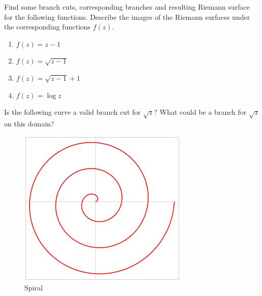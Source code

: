 \begin{exercise}
	Find some branch cuts, corresponding branches and resulting Riemann surface for the following functions. Describe the images of the Riemann surfaces under the corresponding functions $f(z)$.
	\begin{enumerate}
		\item $f(z) = {z-1}$
		\item $f(z) = \sqrt{z-1}$
		\item $f(z) = \sqrt{z-1}+1$
		\item $f(z) = \log z$
	\end{enumerate}
\end{exercise}

\begin{exercise}
	Is the following curve a valid branch cut for $\sqrt{z}$? What could be a branch for $\sqrt{z}$ on this domain?
	\begin{figure}[H]
		\centering
		\includegraphics[width=0.25\linewidth]{images/spiral}
		\caption{Spiral}
	\end{figure}

\end{exercise}



